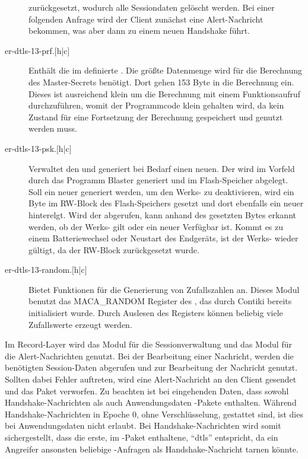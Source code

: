 \begin{description}
					zurückgesetzt, wodurch alle Sessiondaten gelöscht werden. Bei einer folgenden Anfrage wird der Client zunächst eine
					Alert-Nachricht bekommen, was aber dann zu einem neuen Handshake führt.
  \item[er-dtls-13-prf.{$[$h|c$]$}] Enthält die im  definierte . Die größte Datenmenge wird für die Berechnung des Master-Secrets
					benötigt. Dort gehen 153 Byte in die Berechnung ein. Dieses ist ausreichend klein um die Berechnung mit einem
					Funktionsaufruf durchzuführen, womit der Programmcode klein gehalten wird, da kein Zustand für eine Fortsetzung
					der Berechnung gespeichert und genutzt werden muss.
  \item[er-dtls-13-psk.{$[$h|c$]$}] Verwaltet den  und generiert bei Bedarf einen neuen. Der  wird im Vorfeld durch das Programm Blaster
					generiert und im Flash-Speicher abgelegt. Soll ein neuer  generiert werden, um den Werks- zu deaktivieren,
					wird ein Byte im RW-Block des Flash-Speichers gesetzt und dort ebenfalls ein neuer  hinterelgt. Wird der 
					abgerufen, kann anhand des gesetzten Bytes erkannt werden, ob der Werks- gilt oder ein neuer Verfügbar ist.
					Kommt es zu einem Batteriewechsel oder Neustart des Endgeräts, ist der Werks- wieder gültigt, da der RW-Block
					zurückgesetzt wurde.
  \item[er-dtls-13-random.{$[$h|c$]$}] Bietet Funktionen für die Generierung von Zufallszahlen an. Dieses Modul benutzt das MACA\_RANDOM Register des ,
					das durch Contiki bereits initialisiert wurde. Durch Auslesen des Registers können beliebig viele Zufallswerte erzeugt werden.
\end{description}

Im Record-Layer wird das Modul für die Sessionverwaltung und das Modul für die Alert-Nachrichten genutzt. Bei der Bearbeitung einer Nachricht, werden die benötigten
Session-Daten abgerufen und zur Bearbeitung der Nachricht genutzt. Sollten dabei Fehler auftreten, wird eine Alert-Nachricht an den Client gesendet und das Paket verworfen.
Zu beachten ist bei eingehenden Daten, dass sowohl Handshake-Nachrichten als auch Anwendungsdaten -Pakete enthalten. Während Handshake-Nachrichten in
Epoche 0, ohne Verschlüsselung, gestattet sind, ist dies bei Anwendungsdaten nicht erlaubt. Bei Handshake-Nachrichten wird somit sichergestellt, dass die erste,
im -Paket enthaltene,  "`dtls"' entspricht, da ein Angreifer ansonsten beliebige -Anfragen als Handshake-Nachricht tarnen könnte.

